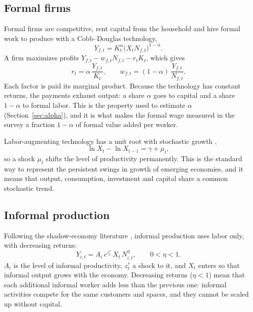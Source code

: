 \subsection{Formal firms}

Formal firms are competitive, rent capital from the household and hire formal work to produce with a Cobb--Douglas technology,
\begin{equation}
Y_{f,t} = K_t^{\alpha}\big(X_tN_{f,t}\big)^{1-\alpha}.
\label{eq:technology}
\end{equation}
A firm maximizes profits $Y_{f,t} - w_{f,t}N_{f,t} - r_tK_t$, which gives
\begin{equation}
r_t = \alpha\,\frac{Y_{f,t}}{K_t}, \qquad w_{f,t} = (1-\alpha)\,\frac{Y_{f,t}}{N_{f,t}} .
\label{eq:foc-firm}
\end{equation}
Each factor is paid its marginal product. Because the technology has constant returns, the payments exhaust output: a share $\alpha$ goes to capital and a share $1-\alpha$ to formal labor. This is the property used to estimate $\alpha$ (Section~\ref{sec:alpha}), and it is what makes the formal wage measured in the survey a fraction $1-\alpha$ of formal value added per worker.

Labor-augmenting technology has a unit root with stochastic growth \citep{AguiarGopinath2007},
\begin{equation}
\ln X_t - \ln X_{t-1} = \gamma + \mu_t ,
\label{eq:trend}
\end{equation}
so a shock $\mu_t$ shifts the level of productivity permanently. This is the standard way to represent the persistent swings in growth of emerging economies, and it means that output, consumption, investment and capital share a common stochastic trend.

\subsection{Informal production}

Following the shadow-economy literature \citep{IhrigMoe2004, ElginOztunali2012}, informal production uses labor only, with decreasing returns:
\begin{equation}
Y_{i,t} = A_i\,e^{z^r_t}\,X_t\,N_{i,t}^{\eta}, \qquad 0<\eta<1 .
\label{eq:informal-technology}
\end{equation}
$A_i$ is the level of informal productivity, $z^r_t$ a shock to it, and $X_t$ enters so that informal output grows with the economy. Decreasing returns ($\eta<1$) mean that each additional informal worker adds less than the previous one: informal activities compete for the same customers and spaces, and they cannot be scaled up without capital.

